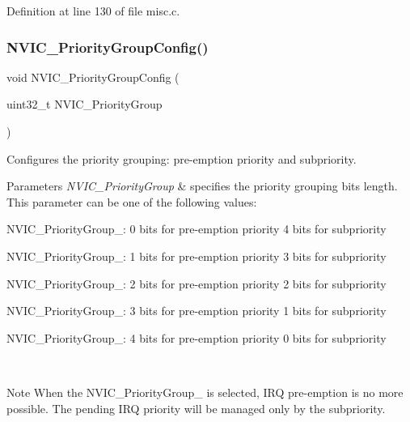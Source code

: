 Definition at line 130 of file misc.\+c.

\mbox{\label{group___m_i_s_c_gadfb1f34f803ce54c976643db8c484442}} 
\subsubsection{\texorpdfstring{N\+V\+I\+C\+\_\+\+Priority\+Group\+Config()}{NVIC\_PriorityGroupConfig()}}
{\footnotesize\ttfamily void N\+V\+I\+C\+\_\+\+Priority\+Group\+Config (\begin{DoxyParamCaption}\item[{uint32\+\_\+t}]{N\+V\+I\+C\+\_\+\+Priority\+Group }\end{DoxyParamCaption})}



Configures the priority grouping\+: pre-\/emption priority and subpriority. 


\begin{DoxyParams}{Parameters}
{\em N\+V\+I\+C\+\_\+\+Priority\+Group} & specifies the priority grouping bits length. This parameter can be one of the following values\+: \begin{DoxyItemize}
\item N\+V\+I\+C\+\_\+\+Priority\+Group\+\_\+: 0 bits for pre-\/emption priority 4 bits for subpriority \item N\+V\+I\+C\+\_\+\+Priority\+Group\+\_\+: 1 bits for pre-\/emption priority 3 bits for subpriority \item N\+V\+I\+C\+\_\+\+Priority\+Group\+\_\+: 2 bits for pre-\/emption priority 2 bits for subpriority \item N\+V\+I\+C\+\_\+\+Priority\+Group\+\_\+: 3 bits for pre-\/emption priority 1 bits for subpriority \item N\+V\+I\+C\+\_\+\+Priority\+Group\+\_\+: 4 bits for pre-\/emption priority 0 bits for subpriority \end{DoxyItemize}
\\
\hline
\end{DoxyParams}
\begin{DoxyNote}{Note}
When the N\+V\+I\+C\+\_\+\+Priority\+Group\+\_ is selected, I\+RQ pre-\/emption is no more possible. The pending I\+RQ priority will be managed only by the subpriority. 
\end{DoxyNote}

